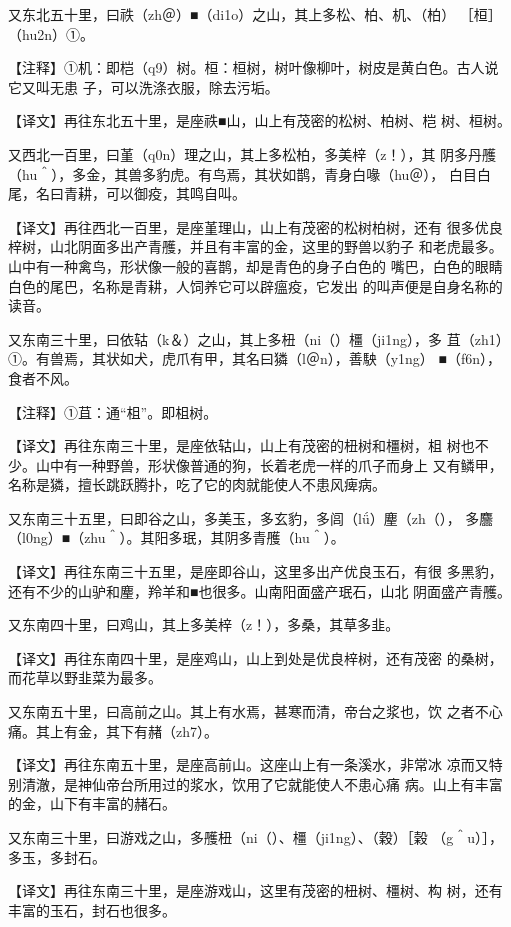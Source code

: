 \documentclass[a4paper,12pt,UTF8,twoside]{ctexbook}
\begin{document}
又东北五十里，曰祑（zh＠）■（di1o）之山，其上多松、柏、机、（柏） ［桓］（hu2n）①。

【注释】①机：即桤（q9）树。桓：桓树，树叶像柳叶，树皮是黄白色。古人说它又叫无患 子，可以洗涤衣服，除去污垢。

【译文】再往东北五十里，是座祑■山，山上有茂密的松树、柏树、桤 树、桓树。

又西北一百里，曰堇（q0n）理之山，其上多松柏，多美梓（z！），其 阴多丹雘（hu＾），多金，其兽多豹虎。有鸟焉，其状如鹊，青身白喙（hu＠）， 白目白尾，名曰青耕，可以御疫，其鸣自叫。

【译文】再往西北一百里，是座堇理山，山上有茂密的松树柏树，还有 很多优良梓树，山北阴面多出产青雘，并且有丰富的金，这里的野兽以豹子 和老虎最多。山中有一种禽鸟，形状像一般的喜鹊，却是青色的身子白色的 嘴巴，白色的眼睛白色的尾巴，名称是青耕，人饲养它可以辟瘟疫，它发出 的叫声便是自身名称的读音。

又东南三十里，曰依轱（k＆）之山，其上多杻（ni（）橿（ji1ng），多 苴（zh1）①。有兽焉，其状如犬，虎爪有甲，其名曰獜（l＠n），善駚（y1ng） ■（f6n），食者不风。

【注释】①苴：通“柤”。即柤树。

【译文】再往东南三十里，是座依轱山，山上有茂密的杻树和橿树，柤 树也不少。山中有一种野兽，形状像普通的狗，长着老虎一样的爪子而身上 又有鳞甲，名称是獜，擅长跳跃腾扑，吃了它的肉就能使人不患风痺病。

又东南三十五里，曰即谷之山，多美玉，多玄豹，多闾（lǘ）麈（zh（）， 多麢（l0ng）■（zhu＾）。其阳多珉，其阴多青雘（hu＾）。

【译文】再往东南三十五里，是座即谷山，这里多出产优良玉石，有很 多黑豹，还有不少的山驴和麈，羚羊和■也很多。山南阳面盛产珉石，山北 阴面盛产青雘。

又东南四十里，曰鸡山，其上多美梓（z！），多桑，其草多韭。

【译文】再往东南四十里，是座鸡山，山上到处是优良梓树，还有茂密 的桑树，而花草以野韭菜为最多。

又东南五十里，曰高前之山。其上有水焉，甚寒而清，帝台之浆也，饮 之者不心痛。其上有金，其下有赭（zh7）。

【译文】再往东南五十里，是座高前山。这座山上有一条溪水，非常冰 凉而又特别清澈，是神仙帝台所用过的浆水，饮用了它就能使人不患心痛 病。山上有丰富的金，山下有丰富的赭石。

又东南三十里，曰游戏之山，多雘杻（ni（）、橿（ji1ng）、（穀）［榖 （g＾u）］，多玉，多封石。

【译文】再往东南三十里，是座游戏山，这里有茂密的杻树、橿树、构 树，还有丰富的玉石，封石也很多。
\end{document}
